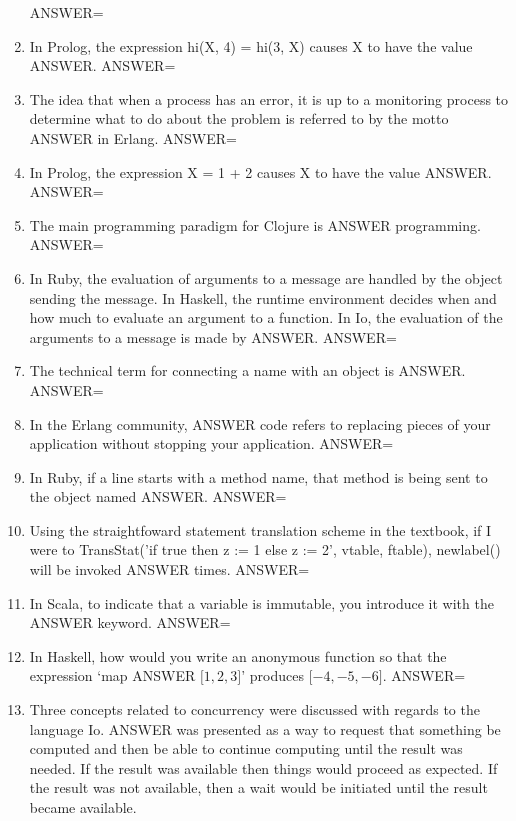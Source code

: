 \documentclass{exam}
\begin{document}
\begin{enumerate}
ANSWER=
\item In Prolog, the expression hi(X, 4) = hi(3, X) causes X to have the value ANSWER.\newline
ANSWER=
\item The idea that when a process has an error, it is up to a monitoring process to determine what to do about the problem is referred to by the motto ANSWER in Erlang.\newline
ANSWER=
\item In Prolog, the expression X = 1 + 2 causes X to have the value ANSWER.\newline
ANSWER=
\item The main programming paradigm for Clojure is ANSWER programming.\newline
ANSWER=
\item In Ruby, the evaluation of arguments to a message are handled by the object sending the message.  In Haskell, the runtime environment decides when and how much to evaluate an argument to a function.  In Io, the evaluation of the arguments to a message is made by ANSWER.\newline
ANSWER=
\item The technical term for connecting a name with an object is ANSWER.\newline
ANSWER=
\item In the Erlang community, ANSWER code refers to replacing pieces of your application without stopping your application.\newline
ANSWER=
\item In Ruby, if a line starts with a method name, that method is being sent to the object named ANSWER.\newline
ANSWER=
\item Using the straightfoward statement translation scheme in the textbook, if I were to TransStat('if true then z := 1 else z := 2', vtable, ftable), newlabel() will be invoked ANSWER times.\newline
ANSWER=
\item In Scala, to indicate that a variable is immutable, you introduce it with the ANSWER keyword.\newline
ANSWER=
\item In Haskell, how would you write an anonymous function so that the expression `map ANSWER $\lbrack 1, 2, 3\rbrack$' produces $\lbrack -4, -5, -6\rbrack$.\newline
ANSWER=
\item Three concepts related to concurrency were discussed with regards to the language Io.  ANSWER was presented as a way to request that something be computed and then be able to continue computing until the result was needed.  If the result was available then things would proceed as expected.  If the result was not available, then a wait would be initiated until the result became available.\newline

\end{enumerate}
\end{document}
